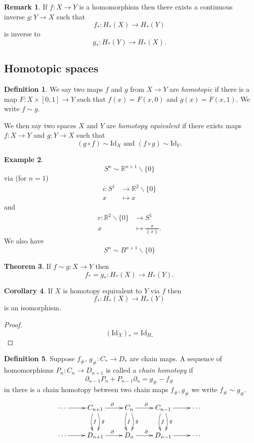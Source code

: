 \documentclass[12pt]{article}
\theoremstyle{definition}
\newtheorem{thm}{Theorem}[subsection]
\newtheorem{cor}[thm]{Corollary}
\theoremstyle{definition}
\newtheorem{defn}[thm]{Definition}
\newtheorem{ex}[thm]{Example}
\newtheorem*{rmk}{Remark}
\newcommand{\RR}{\mathbb{R}}
\newcommand{\C}{C_*}
\renewcommand{\H}{H_*}
\begin{document}
\begin{rmk}
If $f\colon X \to Y$ is a homomorphism then there exists a continuous inverse $g\colon Y \to X$ such that
\[
f_* \colon \H(X) \to \H(Y)
\]
is inverse to
\[
g_* \colon \H(Y) \to \H(X).
\]
\end{rmk}

\subsection{Homotopic spaces}
\begin{defn}
We say two maps $f$ and $g$ from $X \to Y$ are \emph{homotopic} if there is a map $F\colon X\times [0,1] \to Y$ such that
$f(x) = F(x,0)$ and $g(x) = F(x,1)$.
We write $f\sim g$.

We then say two spaces $X$ and $Y$ are \emph{homotopy equivalent} if there exists maps $f\colon X\to Y$ and $g\colon Y \to X$ such that
\[
(g\circ f) \sim \mathrm{Id}_X \text{ and } (f\circ g) \sim \mathrm{Id}_Y.
\]
\end{defn}

\begin{ex}
\[
S^n \sim \RR^{n+1}\smallsetminus\{0\}
\]
via (for $n=1$)
\begin{align*}
i\colon S^1 &\to \RR^2\smallsetminus\{0\}\\
x&\mapsto x
\end{align*}
and
\begin{align*}
r\colon \RR^2\smallsetminus\{0\}&\to S^1\\
x&\mapsto \frac{x}{\| x\|}.
\end{align*}
We also have
\[
S^n \sim B^{n+1}\smallsetminus\{0\}
\]
\end{ex}

\begin{thm}\label{thm:homotopicmapssamehomology}
If $f\sim g \colon X \to Y$ then 
\[
f_* = g_*\colon \H(X) \to \H(Y).
\]
\end{thm}
\begin{cor}
If $X$ is homotopy equivalent to $Y$ via $f$ then 
\[
f_* \colon \H(X) \to \H(Y)
\]
is an isomorphism.
\end{cor}
\begin{proof}
\[
(\mathrm{Id}_X)_* = \mathrm{Id}_{\H}
\]
\end{proof}

\begin{defn}
Suppose $f_\#,\,g_\#\colon\C \to D_*$ are chain maps.
A sequence of homomorphisms $P_n\colon C_n \to D_{n+1}$ is called a \emph{chain homotopy} if
\[
\partial_{n-1} P_n + P_{n-1} \partial_n = g_\# - f_\#
\]
in there is a chain homotopy between two chain maps $f_\#,g_\#$ we write $f_\# \sim g_\#$.
\[
\xymatrix{
\cdots \ar[r] &C_{n+1} \ar[r]^\partial \ar@/_/[d]^f\ar@/^/[d]^g & C_n \ar@/_/[d]^f\ar@/^/[d]^g\ar[r]^\partial & C_{n-1} \ar@/_/[d]^f\ar@/^/[d]^g\ar[r] & \cdots\\
\cdots \ar[r] &D_{n+1} \ar[r]^\partial  & D_n \ar[r]^\partial & D_{n-1} \ar[r] & \cdots
}
\]
\end{defn}
\end{document}
